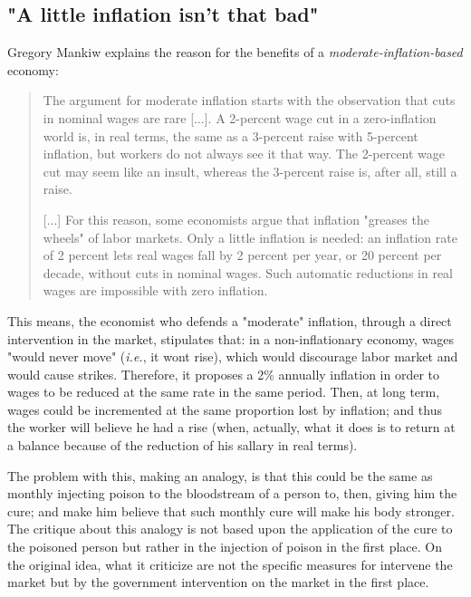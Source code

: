 \documentclass[12pt,a4paper,twoside]{book}
\begin{document}
\subsection{"A little inflation isn't that bad"}
Gregory Mankiw explains the reason for the benefits of a \textit{moderate-inflation-based} economy:

\begin{quotation}
The argument for moderate inflation starts with the observation that cuts in nominal wages are rare [...]. A 2-percent wage cut in a zero-inflation world is, in real terms, the same as a 3-percent raise with 5-percent inflation, but workers do not always see it that way. The 2-percent wage cut may seem like an insult, whereas the 3-percent raise is, after all, still a raise.

[...] For this reason, some economists argue that inflation "greases the wheels" of labor markets. Only a little inflation is needed: an inflation rate of 2 percent lets real wages fall by 2 percent per year, or 20 percent per decade, without cuts in nominal wages. Such automatic reductions in real wages are impossible with zero inflation. \cite[pp. 106-107]{mankiw:macroeconomics}
\end{quotation}

This means, the economist who defends a "moderate" inflation, through a direct intervention in the market, stipulates that: in a non-inflationary economy, wages "would never move" (\textit{i.e.}, it wont rise), which would discourage labor market and would cause strikes. Therefore, it proposes a 2\% annually inflation in order to wages to be reduced at the same rate in the same period. Then, at long term, wages could be incremented at the same proportion lost by inflation; and thus the worker will believe he had a rise (when, actually, what it does is to return at a balance because of the reduction of his sallary in real terms).

The problem with this, making an analogy, is that this could be the same as monthly injecting poison to the bloodstream of a person to, then, giving him the cure; and make him believe that such monthly cure will make his body stronger. The critique about this analogy is not based upon the application of the cure to the poisoned person but rather in the injection of poison in the first place. On the original idea, what it criticize are not the specific measures for intervene the market but by the government intervention on the market in the first place.
\end{document}
